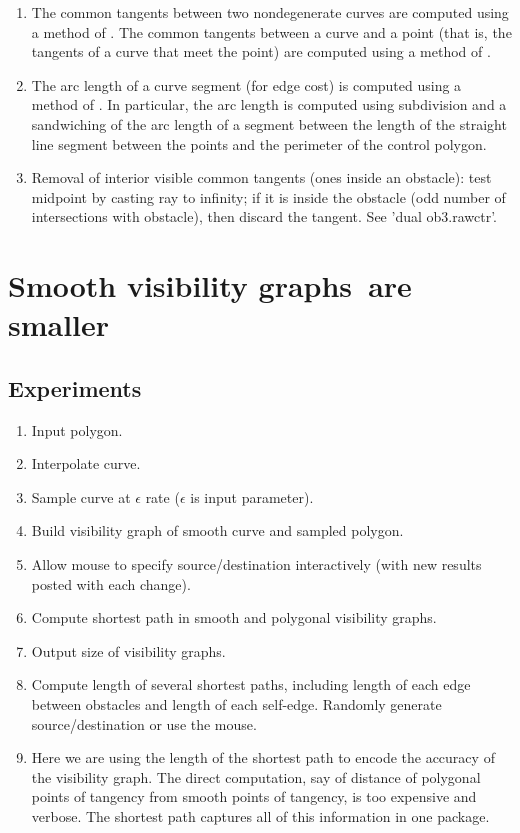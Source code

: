 \documentclass[11pt,twocolumn]{article}
\newcommand{\vgraphs}{visibility graphs\ }
\begin{document}
\begin{enumerate}
\item 
   The common tangents between two nondegenerate curves are 
   computed using a method of \cite{jj00a}.
   The common tangents between a curve and a point (that is, the tangents
   of a curve that meet the point) are computed using a method of \cite{jj00b}.
\item 
   The arc length of a curve segment (for edge cost) is computed
   using a method of \cite{png91}.
   In particular, the arc length is computed using subdivision and
   a sandwiching of the arc length of a segment
   between the length of the straight line segment between the points 
   and the perimeter of the control polygon.
\item 
   Removal of interior visible common tangents (ones inside an obstacle):
  test midpoint by casting ray to infinity; if it is inside the obstacle
  (odd number of intersections with obstacle), then discard the tangent.
  See 'dual ob3.rawctr'.
\end{enumerate}


\section{Smooth \vgraphs are smaller}
\label{sec:size}

\subsection{Experiments}

\begin{enumerate}
\item Input polygon.
\item Interpolate curve.
\item Sample curve at $\epsilon$ rate ($\epsilon$ is input parameter).
\item Build visibility graph of smooth curve and sampled polygon.
\item Allow mouse to specify source/destination interactively (with new
	results posted with each change).
\item Compute shortest path in smooth and polygonal visibility graphs.
\item Output size of visibility graphs.
\item Compute length of several shortest paths, including length
	of each edge between obstacles and length of each self-edge.
	Randomly generate source/destination or use the mouse.
\item Here we are using the length of the shortest path to encode the
	accuracy of the visibility graph.
	The direct computation, say of distance of polygonal points of
	tangency from smooth points of tangency, is too expensive and verbose.
	The shortest path captures all of this information in one package.
\end{enumerate}
\end{document}
